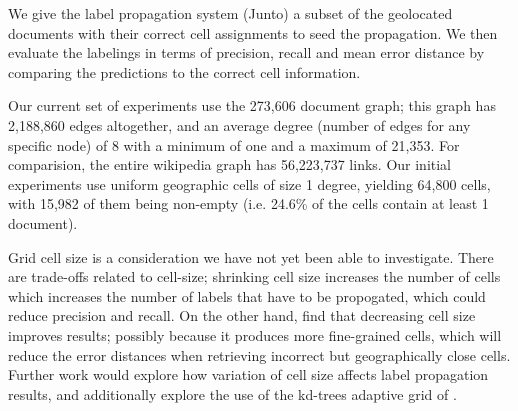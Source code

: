 \par 
We give the label propagation system (Junto) a subset of the geolocated
documents with their correct cell assignments to seed the propagation. We then
evaluate the labelings in terms of precision, recall and mean error
distance by comparing the predictions to the correct cell information.

\par %
Our current set of experiments use the 273,606
document graph; this graph has  2,188,860 edges altogether, and an average
degree (number of edges for any  specific node) of 8 with a minimum of one and
a maximum of 21,353. For comparision, the entire wikipedia graph has 56,223,737 links.
Our initial  experiments use uniform geographic cells of
size 1 degree, yielding 64,800  cells, with 15,982 of them being non-empty
(i.e. 24.6\% of the cells contain at  least 1 document).

\par
Grid cell size is a consideration we have not yet been able to investigate.
There are trade-offs related to cell-size; shrinking cell size increases the
number of cells which increases the number of labels that have to be
propogated, which could reduce precision and recall. On the other hand,
 find that decreasing cell size improves results;
possibly because it produces more fine-grained cells, which will reduce the
error distances when retrieving incorrect but geographically close cells.
Further work would explore how variation of cell size affects label propagation
results, and additionally explore the use of the kd-trees adaptive grid of
.

